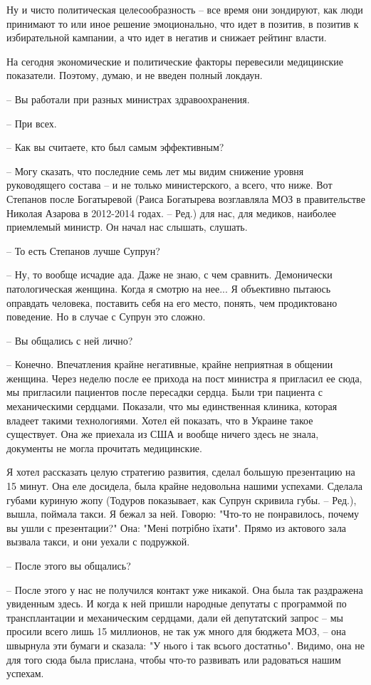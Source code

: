 Ну и чисто политическая целесообразность – все время они зондируют, как люди
принимают то или иное решение эмоционально, что идет в позитив, в позитив к
избирательной кампании, а что идет в негатив и снижает рейтинг власти. 

На сегодня экономические и политические факторы перевесили медицинские
показатели. Поэтому, думаю, и не введен полный локдаун.

– Вы работали при разных министрах здравоохранения.

– При всех.

– Как вы считаете, кто был самым эффективным?

– Могу сказать, что последние семь лет мы видим снижение уровня руководящего
состава – и не только министерского, а всего, что ниже. Вот Степанов после
Богатыревой (Раиса Богатырева возглавляла МОЗ в правительстве Николая Азарова в
2012-2014 годах. – Ред.) для нас, для медиков, наиболее приемлемый министр. Он
начал нас слышать, слушать. 

– То есть Степанов лучше Супрун? 

– Ну, то вообще исчадие ада. Даже не знаю, с чем сравнить. Демонически
патологическая женщина. Когда я смотрю на нее... Я объективно пытаюсь оправдать
человека, поставить себя на его место, понять, чем продиктовано поведение. Но в
случае с Супрун это сложно. 

– Вы общались с ней лично?

– Конечно. Впечатления крайне негативные, крайне неприятная в общении женщина.
Через неделю после ее прихода на пост министра я пригласил ее сюда, мы
пригласили пациентов после пересадки сердца. Были три пациента с механическими
сердцами. Показали, что мы единственная клиника, которая владеет такими
технологиями. Хотел ей показать, что в Украине такое существует. Она же
приехала из США и вообще ничего здесь не знала, документы не могла прочитать
медицинские.

Я хотел рассказать целую стратегию развития, сделал большую презентацию на 15
минут. Она еле досидела, была крайне недовольна нашими успехами. Сделала губами
куриную жопу (Тодуров показывает, как Супрун скривила губы. – Ред.), вышла,
поймала такси. Я бежал за ней. Говорю: "Что-то не понравилось, почему вы ушли с
презентации?" Она: "Мені потрібно їхати". Прямо из актового зала вызвала такси,
и они уехали с подружкой. 

– После этого вы общались? 

– После этого у нас не получился контакт уже никакой. Она была так раздражена
увиденным здесь. И когда к ней пришли народные депутаты с программой по
трансплантации и механическим сердцами, дали ей депутатский запрос – мы просили
всего лишь 15 миллионов, не так уж много для бюджета МОЗ, – она швырнула эти
бумаги и сказала: "У нього і так всього достатньо". Видимо, она не для того
сюда была прислана, чтобы что-то развивать или радоваться нашим успехам.

